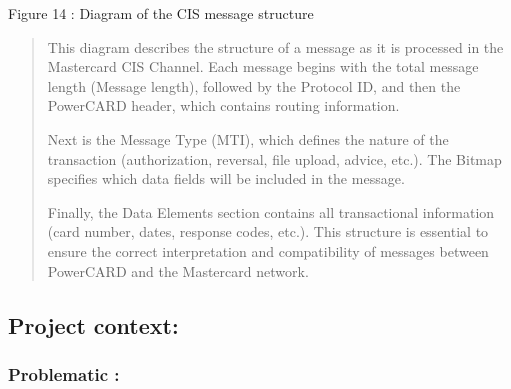 \documentclass[12pt,a4paper]{report}
\begin{document}
\protect\hypertarget{_Toc201954490}{}{}Figure 14 : Diagram of the CIS
message structure

\begin{quote}
This diagram describes the structure of a message as it is processed in
the Mastercard CIS Channel. Each message begins with the total message
length (Message length), followed by the Protocol ID, and then the
PowerCARD header, which contains routing information.

Next is the Message Type (MTI), which defines the nature of the
transaction (authorization, reversal, file upload, advice, etc.). The
Bitmap specifies which data fields will be included in the message.

Finally, the Data Elements section contains all transactional
information (card number, dates, response codes, etc.). This structure
is essential to ensure the correct interpretation and compatibility of
messages between PowerCARD and the Mastercard network.
\end{quote}

\hypertarget{project-context}{%
\subsection{\texorpdfstring{\textbf{Project
context:}}{Project context:}}\label{project-context}}

\hypertarget{problematic}{%
\subsubsection{\texorpdfstring{\textbf{Problematic
:}}{Problematic :}}\label{problematic}}
\end{document}
